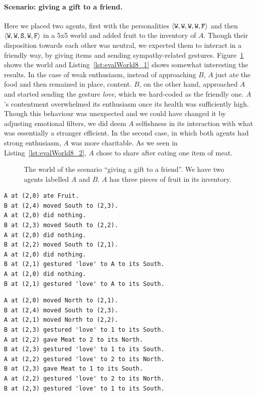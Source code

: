 \paragraph{Scenario: giving a gift to a friend.} Here we placed two agents, first with the personalities $\langle \mathtt{W},\mathtt{W}, \mathtt{W}, \mathtt{W}, \mathtt{F} \rangle$ and then $\langle \mathtt{W},\mathtt{W}, \mathtt{S}, \mathtt{W}, \mathtt{F} \rangle$ in a 5x5 world and added fruit to the inventory of $A$. Though their disposition towards each other was neutral, we expected them to interact in a friendly way, by giving items and sending sympathy-related gestures. Figure~\ref{fig:evalWorld8} shows the world and Listing~\ref{lst:evalWorld8_1} shows somewhat interesting the results. In the case of weak enthusiasm, instead of approaching $B$, $A$ just ate the food and then remained in place, content. $B$, on the other hand, approached $A$ and started sending the gesture \emph{love}, which we hard-coded as the friendly one. $A$'s contentment overwhelmed its enthusiasm once its health was sufficiently high. Though this behaviour was unexpected and we could have changed it by adjusting emotional filters, we did deem $A$ selfishness in its interaction with what was essentially a stranger efficient. In the second case, in which both agents had strong enthusiasm, $A$ was more charitable. As we seen in Listing~\ref{lst:evalWorld8_2}, $A$ chose to share after eating one item of meat.

\begin{figure}
    \centering
    
    \caption{The world of the scenario ``giving a gift to a friend''. We have two agents labelled $A$ and $B$. $A$ has three pieces of fruit in its inventory.}
    \label{fig:evalWorld8}
\end{figure}

\begin{lstlisting}[caption=Actions in the scenario ``giving a gift to a friend'' when both agents had the personality $\personality{W}{W}{W}{W}{F}$., label=lst:evalWorld8_1]
A at (2,0) ate Fruit.
B at (2,4) moved South to (2,3).
A at (2,0) did nothing.
B at (2,3) moved South to (2,2).
A at (2,0) did nothing.
B at (2,2) moved South to (2,1).
A at (2,0) did nothing.
B at (2,1) gestured 'love' to A to its South.
A at (2,0) did nothing.
B at (2,1) gestured 'love' to A to its South.
\end{lstlisting}

\begin{lstlisting}[caption=Actions in the scenario ``giving a gift to a friend'' when both agents had the personality $\personality{W}{W}{S}{W}{F}$., label=list:evalWorld8_2]
A at (2,0) moved North to (2,1).
B at (2,4) moved South to (2,3).
A at (2,1) moved North to (2,2).
B at (2,3) gestured 'love' to 1 to its South.
A at (2,2) gave Meat to 2 to its North.
B at (2,3) gestured 'love' to 1 to its South.
A at (2,2) gestured 'love' to 2 to its North.
B at (2,3) gave Meat to 1 to its South.
A at (2,2) gestured 'love' to 2 to its North.
B at (2,3) gestured 'love' to 1 to its South.
\end{lstlisting}

